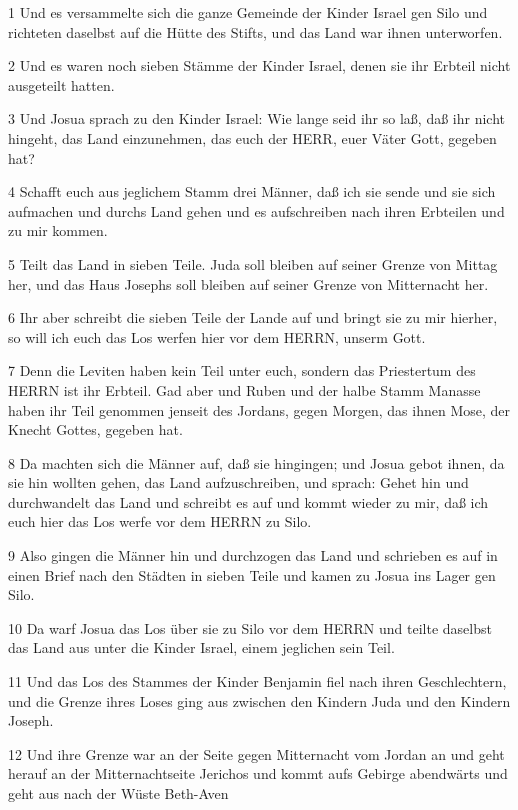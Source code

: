 \par 1 Und es versammelte sich die ganze Gemeinde der Kinder Israel gen Silo und richteten daselbst auf die Hütte des Stifts, und das Land war ihnen unterworfen.
\par 2 Und es waren noch sieben Stämme der Kinder Israel, denen sie ihr Erbteil nicht ausgeteilt hatten.
\par 3 Und Josua sprach zu den Kinder Israel: Wie lange seid ihr so laß, daß ihr nicht hingeht, das Land einzunehmen, das euch der HERR, euer Väter Gott, gegeben hat?
\par 4 Schafft euch aus jeglichem Stamm drei Männer, daß ich sie sende und sie sich aufmachen und durchs Land gehen und es aufschreiben nach ihren Erbteilen und zu mir kommen.
\par 5 Teilt das Land in sieben Teile. Juda soll bleiben auf seiner Grenze von Mittag her, und das Haus Josephs soll bleiben auf seiner Grenze von Mitternacht her.
\par 6 Ihr aber schreibt die sieben Teile der Lande auf und bringt sie zu mir hierher, so will ich euch das Los werfen hier vor dem HERRN, unserm Gott.
\par 7 Denn die Leviten haben kein Teil unter euch, sondern das Priestertum des HERRN ist ihr Erbteil. Gad aber und Ruben und der halbe Stamm Manasse haben ihr Teil genommen jenseit des Jordans, gegen Morgen, das ihnen Mose, der Knecht Gottes, gegeben hat.
\par 8 Da machten sich die Männer auf, daß sie hingingen; und Josua gebot ihnen, da sie hin wollten gehen, das Land aufzuschreiben, und sprach: Gehet hin und durchwandelt das Land und schreibt es auf und kommt wieder zu mir, daß ich euch hier das Los werfe vor dem HERRN zu Silo.
\par 9 Also gingen die Männer hin und durchzogen das Land und schrieben es auf in einen Brief nach den Städten in sieben Teile und kamen zu Josua ins Lager gen Silo.
\par 10 Da warf Josua das Los über sie zu Silo vor dem HERRN und teilte daselbst das Land aus unter die Kinder Israel, einem jeglichen sein Teil.
\par 11 Und das Los des Stammes der Kinder Benjamin fiel nach ihren Geschlechtern, und die Grenze ihres Loses ging aus zwischen den Kindern Juda und den Kindern Joseph.
\par 12 Und ihre Grenze war an der Seite gegen Mitternacht vom Jordan an und geht herauf an der Mitternachtseite Jerichos und kommt aufs Gebirge abendwärts und geht aus nach der Wüste Beth-Aven
